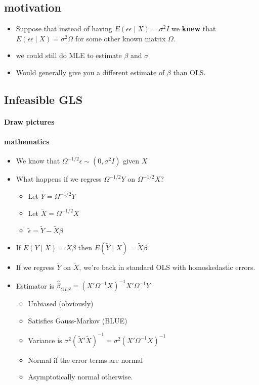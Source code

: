 \subsection{motivation}
\label{sec-3-1}

\begin{itemize}
\item Suppose that instead of having $E( \epsilon \epsilon \mid X) =
       \sigma^2 I$ we \textbf{knew} that $E(\epsilon \epsilon \mid X) =
       \sigma^2 \Omega$ for some other known matrix $\Omega$.
\item we could still do MLE to estimate $\beta$ and $\sigma$
\item Would generally give you a different estimate of $\beta$ than
       OLS.
\end{itemize}
\subsection{Infeasible GLS}
\label{sec-3-2}
\paragraph{Draw pictures}
\label{sec-3-2-1}
\paragraph{mathematics}
\label{sec-3-2-2}

\begin{itemize}
\item We know that $\Omega^{-1/2}\epsilon \sim (0, \sigma^2 I)$ given $X$
\item What happens if we regress $\Omega^{-1/2} Y$ on $\Omega^{-1/2} X$?
\begin{itemize}
\item Let $\tilde Y = \Omega^{-1/2} Y$
\item Let $\tilde X = \Omega^{-1/2} X$
\item $\tilde\epsilon = \tilde Y - \tilde X \beta$
\end{itemize}
\item If $E(Y \mid X) = X\beta$ then $E(\tilde Y \mid X) = \tilde X
        \beta$
\item If we regress $\tilde Y$ on $\tilde X$, we're back in standard
        OLS with homoskedastic errors.
\item Estimator is $\hat\beta_{GLS} =
        (X'\Omega^{-1}X)^{-1}X'\Omega^{-1}Y$
\begin{itemize}
\item Unbiased (obviously)
\item Satisfies Gauss-Markov (BLUE)
\item Variance is $\sigma^2 (\tilde X' \tilde X)^{-1} = \sigma^2
          (X' \Omega^{-1} X)^{-1}$
\item Normal if the error terms are normal
\item Asymptotically normal otherwise.
\end{itemize}
\end{itemize}
